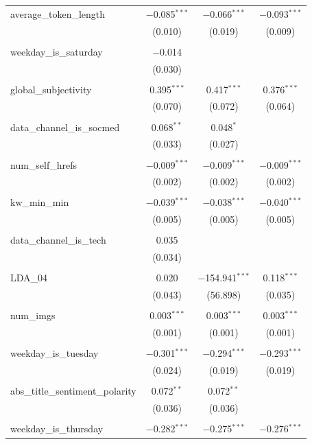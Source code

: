 \begin{table}[!htbp]
\begin{tabular}{@{\extracolsep{5pt}}lccc}
 average\_token\_length & $-$0.085$^{***}$ & $-$0.066$^{***}$ & $-$0.093$^{***}$ \\ 
  & (0.010) & (0.019) & (0.009) \\ 
  & & & \\ 
 weekday\_is\_saturday & $-$0.014 &  &  \\ 
  & (0.030) &  &  \\ 
  & & & \\ 
 global\_subjectivity & 0.395$^{***}$ & 0.417$^{***}$ & 0.376$^{***}$ \\ 
  & (0.070) & (0.072) & (0.064) \\ 
  & & & \\ 
 data\_channel\_is\_socmed & 0.068$^{**}$ & 0.048$^{*}$ &  \\ 
  & (0.033) & (0.027) &  \\ 
  & & & \\ 
 num\_self\_hrefs & $-$0.009$^{***}$ & $-$0.009$^{***}$ & $-$0.009$^{***}$ \\ 
  & (0.002) & (0.002) & (0.002) \\ 
  & & & \\ 
 kw\_min\_min & $-$0.039$^{***}$ & $-$0.038$^{***}$ & $-$0.040$^{***}$ \\ 
  & (0.005) & (0.005) & (0.005) \\ 
  & & & \\ 
 data\_channel\_is\_tech & 0.035 &  &  \\ 
  & (0.034) &  &  \\ 
  & & & \\ 
 LDA\_04 & 0.020 & $-$154.941$^{***}$ & 0.118$^{***}$ \\ 
  & (0.043) & (56.898) & (0.035) \\ 
  & & & \\ 
 num\_imgs & 0.003$^{***}$ & 0.003$^{***}$ & 0.003$^{***}$ \\ 
  & (0.001) & (0.001) & (0.001) \\ 
  & & & \\ 
 weekday\_is\_tuesday & $-$0.301$^{***}$ & $-$0.294$^{***}$ & $-$0.293$^{***}$ \\ 
  & (0.024) & (0.019) & (0.019) \\ 
  & & & \\ 
 abs\_title\_sentiment\_polarity & 0.072$^{**}$ & 0.072$^{**}$ &  \\ 
  & (0.036) & (0.036) &  \\ 
  & & & \\ 
 weekday\_is\_thursday & $-$0.282$^{***}$ & $-$0.275$^{***}$ & $-$0.276$^{***}$ \\ 

\end{tabular}
\end{table}
